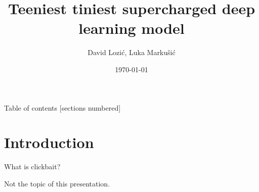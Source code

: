 \documentclass[10pt, utf8]{beamer}
\title{Teeniest tiniest supercharged deep learning model}
\date{\today}
\author{David Lozić, Luka Markušić}
\institute{Faculty of Electrical Engineering and Computing}
\begin{document}
\maketitle

\begin{frame}{Table of contents}
  [sections numbered]
  \tableofcontents[hideallsubsections]
\end{frame}

\section{Introduction}

\begin{frame}[fragile]{What is clickbait?}

    Not the topic of this presentation.
\end{frame}
\end{document}
